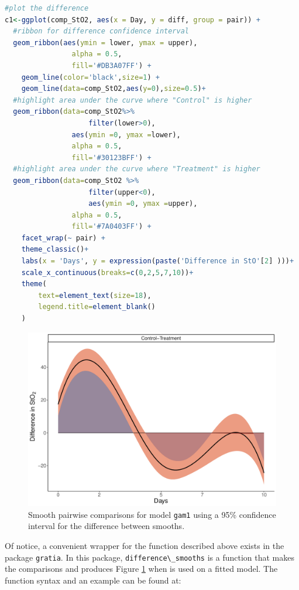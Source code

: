 \documentclass[
]{article}
\newcommand{\passthrough}[1]{#1}
\begin{document}
\begin{lstlisting}[language=R]
#plot the difference
c1<-ggplot(comp_StO2, aes(x = Day, y = diff, group = pair)) +
  #ribbon for difference confidence interval  
  geom_ribbon(aes(ymin = lower, ymax = upper),
                alpha = 0.5,
                fill='#DB3A07FF') +
    geom_line(color='black',size=1) +
    geom_line(data=comp_StO2,aes(y=0),size=0.5)+
  #highlight area under the curve where "Control" is higher
  geom_ribbon(data=comp_StO2%>%
                    filter(lower>0),
                aes(ymin =0, ymax =lower),
                alpha = 0.5,
                fill='#30123BFF') +
  #highlight area under the curve where "Treatment" is higher
  geom_ribbon(data=comp_StO2 %>%
                    filter(upper<0),
                    aes(ymin =0, ymax =upper),
                alpha = 0.5,
                fill='#7A0403FF') +
    facet_wrap(~ pair) +
    theme_classic()+
    labs(x = 'Days', y = expression(paste('Difference in StO'[2] )))+
    scale_x_continuous(breaks=c(0,2,5,7,10))+
    theme(
        text=element_text(size=18),
        legend.title=element_blank()
    )
\end{lstlisting}



\begin{figure}[H]

{\centering \includegraphics[width=0.75\linewidth,]{Full_document_files/figure-latex/pairwise-comp-workflow-fig-1} 

}

\caption{Smooth pairwise comparisons for model \passthrough{\lstinline!gam1!} using a 95\% confidence interval for the difference between smooths.}\label{fig:pairwise-comp-workflow-fig}
\end{figure}

Of notice, a convenient wrapper for the function described above exists in the package \passthrough{\lstinline!gratia!}. In this package, \passthrough{\lstinline!difference\_smooths!} is a function that makes the comparisons and produces Figure \ref{fig:pairwise-comp-workflow-fig} when is used on a fitted model. The function syntax and an example can be found at:
\end{document}
